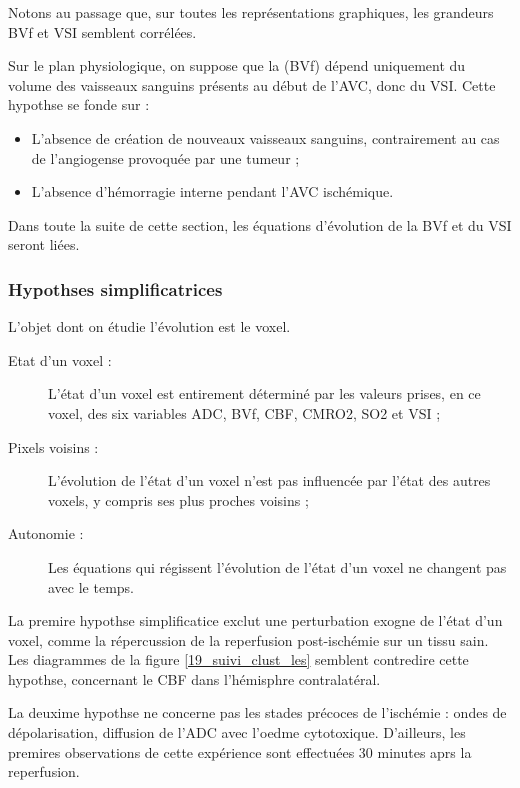 \par
Notons au passage que, sur toutes les repr\'esentations graphiques, les grandeurs BVf et VSI semblent corr\'el\'ees.

\par
Sur le plan physiologique, on suppose que la (BVf) d\'epend uniquement du volume %
des vaisseaux sanguins pr\'esents au d\'ebut de l'AVC, donc du VSI. %
Cette hypothse se fonde sur :
\begin{itemize}
\item L'absence de cr\'eation de nouveaux vaisseaux sanguins, contrairement au cas de l'angiogense provoqu\'ee par une tumeur ;
\item L'absence d'h\'emorragie interne pendant l'AVC isch\'emique.
\end{itemize}

\par
Dans toute la suite de cette section, les \'equations d'\'evolution de la BVf et du VSI seront li\'ees.

\subsubsection{Hypothses simplificatrices}

L'objet dont on \'etudie l'\'evolution est le voxel.
\begin{description}
\item[Etat d'un voxel :] L'\'etat d'un voxel est entirement d\'etermin\'e par les valeurs prises, en ce voxel, des six variables ADC, BVf, CBF, CMRO2, SO2 et VSI ;
\item[Pixels voisins :] L'\'evolution de l'\'etat d'un voxel n'est pas influenc\'ee par l'\'etat des autres voxels, y compris ses plus proches voisins ;
\item[Autonomie :] Les \'equations qui r\'egissent l'\'evolution de l'\'etat d'un voxel ne changent pas avec le temps.
\end{description}

La premire hypothse simplificatice exclut une perturbation exogne de l'\'etat d'un voxel, %
comme la r\'epercussion de la reperfusion post-isch\'emie sur un tissu sain. %
Les diagrammes de la figure \ref{19_suivi_clust_les} semblent contredire cette hypothse, concernant le CBF dans l'h\'emisphre contralat\'eral.

\par
La deuxime hypothse ne concerne pas les stades pr\'ecoces de l'isch\'emie : ondes de d\'epolarisation, diffusion de l'ADC avec l'oedme cytotoxique. %
D'ailleurs, les premires observations de cette exp\'erience sont effectu\'ees 30 minutes aprs la reperfusion.

